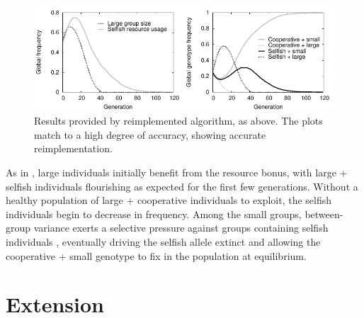 \documentclass[11pt]{article}
\begin{document}
\begin{figure}[!ht]
  \centering
  \includegraphics{equalplot.pdf}
  \caption{Results provided by reimplemented algorithm, as above. The plots match to a high degree of accuracy, showing accurate reimplementation. 
  }
  \label{fig:equalplot}
\end{figure}

As in \citet{orig}, large individuals initially benefit from the resource bonus, with large + selfish individuals flourishing as expected for the first few generations. Without a healthy population of large + cooperative individuals to exploit, the selfish individuals begin to decrease in frequency. Among the small groups, between-group variance exerts a selective pressure against groups containing selfish individuals \citep{Watson2011}, eventually driving the selfish allele extinct and allowing the cooperative + small genotype to fix in the population at equilibrium.

\clearpage
\section{Extension}
\label{sec:extension}
\end{document}
